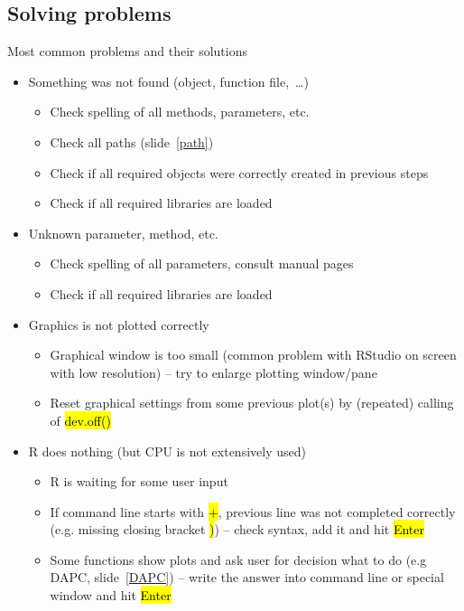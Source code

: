\documentclass[compress, ucs, xelatex, 11pt, xcolor=svgnames,
  hyperref={
    bookmarks=true,
    unicode=true,
    colorlinks=true,
    pdftitle={Molecular data in R},
    plainpages=false,
    pdfauthor={Vojtech Zeisek},
    pdfsubject={Course about phylogeny and evolution in R},
    pdfcreator={XeLaTeX},
    pdfkeywords={R, evolution, phylogeny, molecular data},
    linkcolor=Tomato,
    anchorcolor=SaddleBrown,
    citecolor=Goldenrod,
    filecolor=DarkMagenta,
    menucolor=Sienna,
    urlcolor=DarkTurquoise,
    pdftex},
  url={hyphens, lowtilde} %
  ]{beamer}
\renewcommand{\texttt}[1]{\hl{\ttfamily #1}}
\begin{document}
\subsection{Solving problems}

\begin{frame}[allowframebreaks]{Most common problems and their solutions}
  \label{problems}
  \begin{itemize}
    \item Something was not found (object, function file,~\ldots)
    \begin{itemize}
      \item Check spelling of all methods, parameters, etc.
      \item Check all paths (slide~\ref{path})
      \item Check if all required objects were correctly created in previous steps
      \item Check if all required libraries are loaded
    \end{itemize}
    \item Unknown parameter, method, etc.
    \begin{itemize}
      \item Check spelling of all parameters, consult manual pages
      \item Check if all required libraries are loaded
    \end{itemize}
    \item Graphics is not plotted correctly
    \begin{itemize}
      \item Graphical window is too small (common problem with RStudio on screen with low resolution) -- try to enlarge plotting window/pane
      \item Reset graphical settings from some previous plot(s) by (repeated) calling of \texttt{dev.off()}
    \end{itemize}
    \item R does nothing (but CPU is not extensively used)
    \begin{itemize}
      \item R is waiting for some user input
      \item If command line starts with \texttt{+}, previous line was not completed correctly (e.g. missing closing bracket \texttt{)}) -- check syntax, add it and hit \texttt{Enter}
      \item Some functions show plots and ask user for decision what to do (e.g DAPC, slide~\ref{DAPC}) -- write the answer into command line or special window and hit \texttt{Enter}

\end{itemize}
\end{itemize}
\end{frame}
\end{document}
